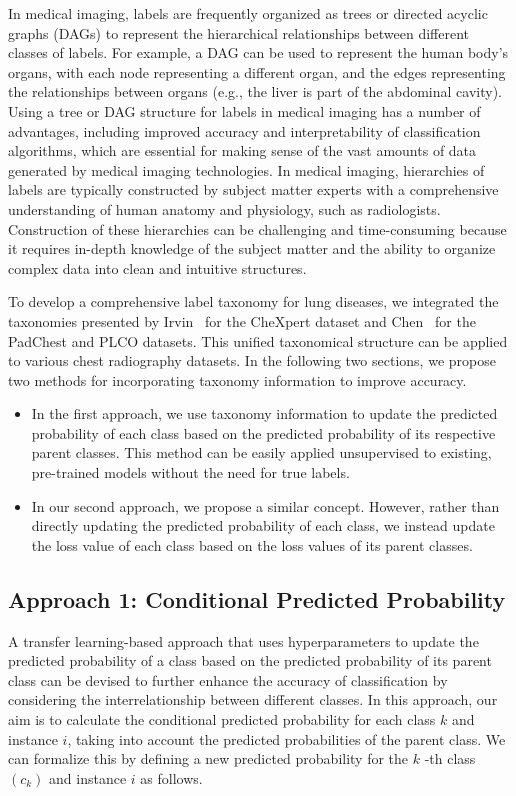 In medical imaging, labels are frequently organized as trees or directed acyclic graphs (DAGs) to represent the hierarchical relationships between different classes of labels. For example, a DAG can be used to represent the human body's organs, with each node representing a different organ, and the edges representing the relationships between organs (e.g., the liver is part of the abdominal cavity). Using a tree or DAG structure for labels in medical imaging has a number of advantages, including improved accuracy and interpretability of classification algorithms, which are essential for making sense of the vast amounts of data generated by medical imaging technologies. In medical imaging, hierarchies of labels are typically constructed by subject matter experts with a comprehensive understanding of human anatomy and physiology, such as radiologists. Construction of these hierarchies can be challenging and time-consuming because it requires in-depth knowledge of the subject matter and the ability to organize complex data into clean and intuitive structures.

To develop a comprehensive label taxonomy for lung diseases, we integrated the taxonomies presented by Irvin~\cite{irvin_CheXpert_2019} for the CheXpert dataset and Chen~\cite{chen_Deep_2020} for the PadChest and PLCO datasets. This unified taxonomical structure can be applied to various chest radiography datasets. In the following two sections, we propose two methods for incorporating taxonomy information to improve accuracy.

\begin{itemize}
    \item In the first approach, we use taxonomy information to update the predicted probability of each class based on the predicted probability of its respective parent classes. This method can be easily applied unsupervised to existing, pre-trained models without the need for true labels.

    \item  In our second approach, we propose a similar concept. However, rather than directly updating the predicted probability of each class, we instead update the loss value of each class based on the loss values of its parent classes.
\end{itemize}

\subsection{Approach 1: Conditional Predicted Probability}A transfer learning-based approach that uses hyperparameters to update the predicted probability of a class based on the predicted probability of its parent class can be devised to further enhance the accuracy of classification by considering the interrelationship between different classes. In this approach, our aim is to calculate the conditional predicted probability for each class $k $ and instance $i $, taking into account the predicted probabilities of the parent class. We can formalize this by defining a new predicted probability for the $k $ -th class $(c_k) $ and instance $i $ as follows.

